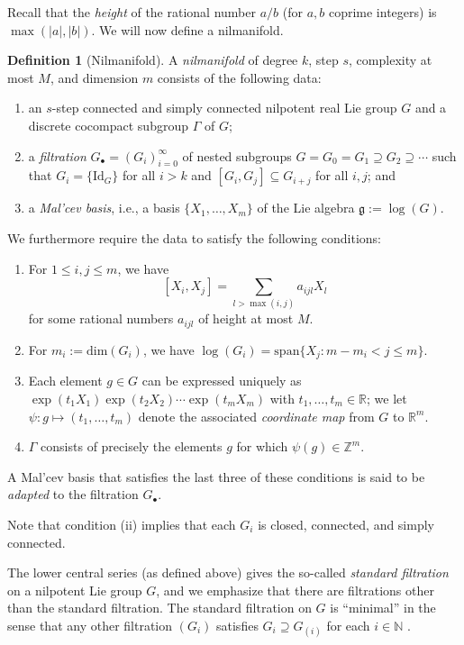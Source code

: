 \documentclass[11pt]{amsart}
\theoremstyle{definition}
\newtheorem{definition}[lemma]{Definition}
\newcommand{\N}{{\mathbb N}}
\begin{document}
Recall that the \emph{height} of the rational number $a/b$ (for $a,b$ coprime integers) is $\max(|a|,|b|)$.
We will now define a nilmanifold.

\begin{definition}[Nilmanifold]
A \emph{nilmanifold} of degree $k$, step $s$, complexity at most $M$, and dimension $m$ consists of the following data:
\begin{enumerate}
    \item an $s$-step connected and simply connected nilpotent real Lie group $G$ and a discrete cocompact subgroup $\Gamma$ of $G$;
    \item a \emph{filtration} $G_\bullet = (G_i)_{i = 0}^\infty$ of nested subgroups $G = G_0=G_1 \supseteq G_2 \supseteq \cdots$ such that $G_{i}=\{\mathrm{Id}_G\}$ for all $i>k$ and $[G_i,G_j] \subseteq G_{i+j}$ for all $i,j$; and
    \item a \emph{Mal'cev basis}, i.e., a basis $\{X_1, \dots, X_m\}$ of the Lie algebra $\mathfrak{g} := \log(G)$.
\end{enumerate}
We furthermore require the data to satisfy the following conditions:
\begin{enumerate}
    \item For $1 \le i, j \le m$, we have
    $$[X_i, X_j] = \sum_{l > \max(i, j)} a_{ijl} X_l$$
    for some rational numbers $a_{ijl}$ of height at most $M$.
    \item For $m_i := \text{dim}(G_i)$, we have $\log(G_i) = \text{span}\{X_j: m - m_i < j \le m\}$.
    \item Each element $g \in G$ can be expressed uniquely as $\exp(t_1X_1)\exp(t_2X_2) \cdots \exp(t_mX_m)$ with $t_1, \dots, t_m \in \mathbb{R}$; we let $\psi: g \mapsto (t_1, \ldots, t_m)$ denote the associated \emph{coordinate map} from $G$ to $\mathbb{R}^m$.
    \item $\Gamma$ consists of precisely the elements $g$ for which $\psi(g) \in \mathbb{Z}^m$.
\end{enumerate}
A Mal'cev basis that satisfies the last three of these conditions is said to be \textit{adapted} to the filtration $G_\bullet$.
\end{definition}

Note that condition (ii) implies that each $G_i$ is closed, connected, and simply connected.


The lower central series (as defined above) gives the so-called \textit{standard filtration} on a nilpotent Lie group $G$, and we emphasize that there are filtrations other than the standard filtration.  The standard filtration on $G$ is ``minimal'' in the sense that any other filtration $(G_i)$ satisfies $G_i \supseteq G_{(i)}$ for each $i\in\N$ \cite[Exercise 1.6.2]{T12}. 
\end{document}
